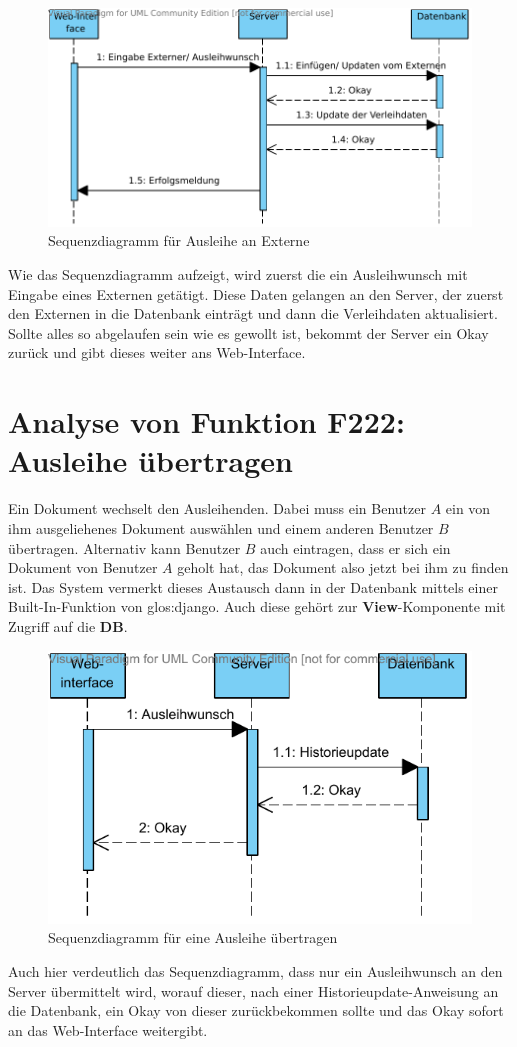 \begin{figure}[H]
\begin{center}
\includegraphics[width=0.8\linewidth]{bilder/Seq-Ausleihe.pdf}
\caption{Sequenzdiagramm für Ausleihe an Externe}
\label{fig:221}
\end{center}
\end{figure}
Wie das Sequenzdiagramm aufzeigt, wird zuerst die ein Ausleihwunsch mit Eingabe eines Externen getätigt. Diese Daten gelangen an den Server, der zuerst den Externen in die Datenbank einträgt und dann die Verleihdaten aktualisiert. Sollte alles so abgelaufen sein wie es gewollt ist, bekommt der Server ein Okay zurück und gibt dieses weiter ans Web-Interface.

\section{Analyse von Funktion F222: Ausleihe übertragen}
\label{f:222}
Ein Dokument wechselt den Ausleihenden. Dabei muss ein Benutzer $A$ ein von ihm 
ausgeliehenes Dokument auswählen und einem anderen Benutzer $B$ übertragen. 
Alternativ kann Benutzer $B$ auch eintragen, dass er sich ein Dokument von 
Benutzer $A$ geholt hat, das Dokument also jetzt bei ihm zu finden ist. Das 
System vermerkt dieses Austausch dann in der Datenbank mittels einer 
Built-In-Funktion von \gls{glos:django}. Auch diese gehört zur 
\textbf{View}-Komponente mit Zugriff auf die \textbf{DB}.

\begin{figure}[H]
\begin{center}
\includegraphics[width=0.6\linewidth]{bilder/seq-uebertragen.pdf}
\caption{Sequenzdiagramm für eine Ausleihe übertragen}
\label{fig:222}
\end{center}
\end{figure}
Auch hier verdeutlich das Sequenzdiagramm, dass nur ein Ausleihwunsch an den Server übermittelt wird, worauf dieser, nach einer Historieupdate-Anweisung an die Datenbank, ein Okay von dieser zurückbekommen sollte und das Okay sofort an das Web-Interface weitergibt.

